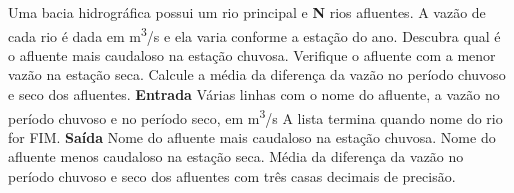 \documentclass[a4paper, 12pt]{article}
\begin{document}
Uma bacia hidrográfica possui um rio principal e \textbf{N} rios afluentes. A vazão de cada rio é dada em m\textsuperscript{3}/s e ela varia conforme a estação do ano. Descubra qual é o afluente mais caudaloso na estação chuvosa. Verifique o afluente com a menor vazão na estação seca. Calcule a média da diferença da vazão no período chuvoso e seco dos afluentes.
\newline \newline
\textbf{{\large Entrada}} \newline
Várias linhas com o nome do afluente, a vazão no período chuvoso e no período seco, em m\textsuperscript{3}/s \newline
A lista termina quando nome do rio for FIM.
\newline \newline
\textbf{{\large Saída}} \newline
Nome do afluente mais caudaloso na estação chuvosa. \newline
Nome do afluente menos caudaloso na estação seca. \newline
Média da diferença da vazão no período chuvoso e seco dos afluentes com três casas decimais de precisão.
\newline \newline
\newline
\end{document}
